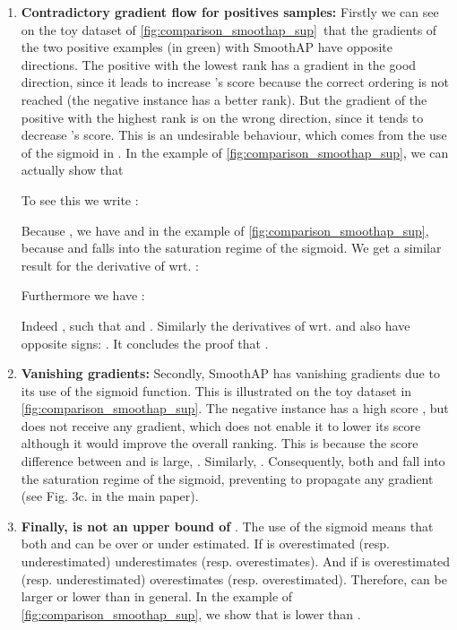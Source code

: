 \begin{enumerate}[i]
    
    \item \textbf{Contradictory gradient flow for positives samples:} Firstly we can see on the toy dataset of \cref{fig:comparison_smoothap_sup}~that the gradients of the two positive examples (in green) with SmoothAP have opposite directions. The positive with the lowest rank  has a gradient in the good direction, since it leads to increase 's score because the correct ordering is not reached (the negative instance  has a better rank). But the gradient of the positive with the highest rank  is on the wrong direction, since it tends to decrease 's score. This is an undesirable behaviour, which comes from the use of the sigmoid in . In the example of \cref{fig:comparison_smoothap_sup}, we can actually show that 
    
    
    
    
    
    
    To see this we write :


Because , we have  and  in the example of \cref{fig:comparison_smoothap_sup}, because  and  falls into the saturation regime of the sigmoid. We get a similar result for the derivative of  wrt.  :
    


Furthermore we have :




Indeed , such that  and . Similarly the derivatives of  wrt.  and  also have opposite signs: . It concludes the proof that .
    
    
    \item \textbf{Vanishing gradients:} Secondly, SmoothAP \cite{smoothap} has vanishing gradients due to its use of the sigmoid function. This is illustrated on the toy dataset in \cref{fig:comparison_smoothap_sup}. The negative instance  has a high score , but does not receive any gradient, which does not enable it to lower its score although it would improve the overall ranking. This is because the score difference between  and  is large, \ie . Similarly, . Consequently, both  and  fall into the saturation regime of the sigmoid, preventing to propagate any gradient (see Fig. 3c. in the main paper).

    \item  \textbf{Finally,  is not an upper bound of }. The use of the sigmoid means that both  and  can be over or under estimated. If  is overestimated (resp. underestimated)  underestimates  (resp. overestimates). And if  is overestimated (resp. underestimated)  overestimates  (resp. overestimated). Therefore,  can be larger or lower than  in general. In the example of \cref{fig:comparison_smoothap_sup}, we show that  is lower than .
    
\end{enumerate}





